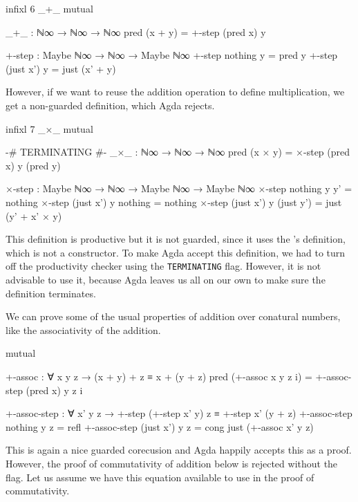 \begin{code}[hide]
infixl 6 _+_
mutual
\end{code}
\begin{code}
  _+_ : ℕ∞ → ℕ∞ → ℕ∞
  pred (x + y) = +-step (pred x) y

  +-step : Maybe ℕ∞ → ℕ∞ → Maybe ℕ∞
  +-step nothing    y = pred y
  +-step (just x')  y = just (x' + y)
\end{code}

However, if we want to reuse the addition operation to define multiplication, we
get a non-guarded definition, which Agda rejects.

\begin{code}[hide]
infixl 7 _×_
mutual
\end{code}
\begin{code}
  {-# TERMINATING #-}
  _×_ : ℕ∞ → ℕ∞ → ℕ∞
  pred (x × y) = ×-step (pred x) y (pred y)

  ×-step :
    Maybe ℕ∞ → ℕ∞ → Maybe ℕ∞ → Maybe ℕ∞
  ×-step nothing    y y'         = nothing
  ×-step (just x')  y nothing    = nothing
  ×-step (just x')  y (just y')  = just (y' + x' × y)
\end{code}

This definition is productive but it is not guarded, since it uses the
\AgdaFunction{\_+\_}'s definition, which is not a constructor. To make Agda
accept this definition, we had to turn off the productivity checker using the
\texttt{TERMINATING} flag. However, it is not advisable to use it, because Agda
leaves us all on our own to make sure the definition terminates.

We can prove some of the usual properties of addition over conatural numbers,
like the associativity of the addition.

\begin{code}[hide]
mutual
\end{code}
\begin{code}
  +-assoc : ∀ x y z → (x + y) + z ≡ x + (y + z)
  pred (+-assoc x y z i) = +-assoc-step (pred x) y z i

  +-assoc-step :
    ∀ x' y z →
    +-step (+-step x' y) z ≡ +-step x' (y + z)
  +-assoc-step nothing    y z = refl
  +-assoc-step (just x')  y z = cong just (+-assoc x' y z)
\end{code}

This is again a nice guarded corecusion and Agda happily accepts this as a
proof. However, the proof of commutativity of addition below is rejected without
the  flag. Let us assume we have this equation
available to use in the proof of commutativity.

